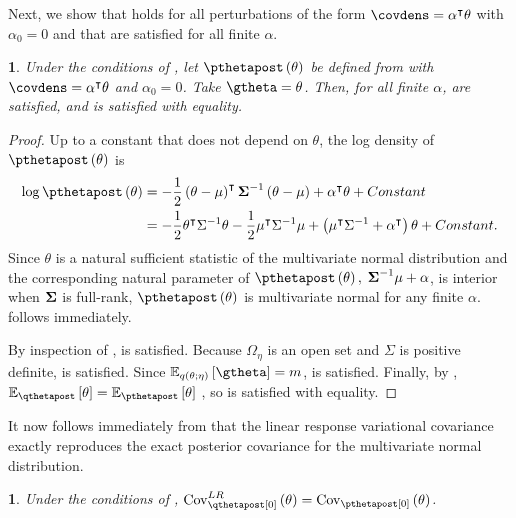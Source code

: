 \documentclass{article}\usepackage[]{graphicx}\usepackage[]{color}
\theoremstyle{definition}
\theoremstyle{plain}
\theoremstyle{plain}
\theoremstyle{plain}
\newtheorem{cor}{\protect\corollaryname}
\theoremstyle{definition}
\theoremstyle{plain}
\newtheorem{lem}{\protect\lemmaname}
\theoremstyle{plain}
\providecommand{\corollaryname}{Corollary}
\providecommand{\lemmaname}{Lemma}
\begin{document}
Next, we show that  holds for all perturbations
of the form $\covdens=\alpha^{\trans}\theta$ with $\alpha_{0}=0$
and that \vbassum are satisfied for all finite $\alpha$.
\begin{lem}
\label{lem:mvn_perturbation_exact}Under the conditions of
, let $\pthetapost\left(\theta\right)$ be defined from
 with $\covdens=\alpha^{\trans}\theta$ and
$\alpha_{0}=0$. Take $\gtheta=\theta$. Then, for all finite $\alpha$, \vbassum
are satisfied, and  is satisfied with equality.
\end{lem}
\begin{proof}
Up to a constant that does not depend on $\theta$, the log density
of $\pthetapost\left(\theta\right)$ is
\begin{align*}
\log\pthetapost\left(\theta\right) & =
    -\frac{1}{2}\left(\theta-\mu\right)^{\trans}\covmat^{-1}
    \left(\theta-\mu\right)+\alpha^{\trans}\theta+\constant\\
 & =-\frac{1}{2}\theta^{\trans}\Sigma^{-1}\theta-
    \frac{1}{2}\mu^{\trans}\Sigma^{-1}\mu+\left(\mu^{\trans}\Sigma^{-1}+
    \alpha^{\trans}\right)\theta+\constant.
\end{align*}
Since $\theta$ is a natural sufficient statistic of the multivariate normal
distribution and the corresponding natural parameter of
$\pthetapost\left(\theta\right),$ $\boldsymbol{\Sigma}^{-1}\mu+\alpha$, is interior when
$\boldsymbol{\Sigma}$ is full-rank, $\pthetapost\left(\theta\right)$ is multivariate normal
for any finite $\alpha$.  follows immediately.

By inspection of ,
 is satisfied. Because $\Omega_{\eta}$ is an
open set and $\Sigma$ is positive definite,  is
satisfied. Since $\mbe_{q\left(\theta;\eta\right)}\left[\gtheta\right]=m$,
 is satisfied. Finally, by
,
$\mbe_{\qthetapost}\left[\theta\right]=\mbe_{\pthetapost}\left[\theta\right]$ ,
so  is satisfied with equality.
\end{proof}
It now follows immediately from
 that the linear response variational
covariance exactly reproduces the exact posterior covariance for the
multivariate normal distribution.
\begin{cor}
\label{cor:mvn_cov_exact}
Under the conditions of ,
$\lrvbcov\left(\theta\right)=\pcov\left(\theta\right)$.
\end{cor}
\end{document}
